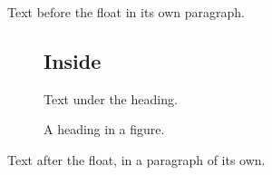 \documentclass[12pt]{article}
\begin{document}
Text before the float in its own paragraph.

\begin{figure}[h]
\subsection*{Inside}
Text under the heading.
\caption{A heading in a figure.}
\end{figure}

Text after the float, in a paragraph of its own.
\end{document}
